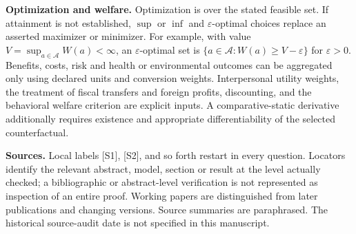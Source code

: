 \documentclass[11pt,a4paper]{article}
\begin{document}
\textbf{Optimization and welfare.} Optimization is over the stated feasible set. If attainment is not established, $\sup$ or $\inf$ and $\varepsilon$-optimal choices replace an asserted maximizer or minimizer. For example, with value $V=\sup_{a\in\mathcal A}W(a)<\infty$, an $\varepsilon$-optimal set is $\{a\in\mathcal A:W(a)\geq V-\varepsilon\}$ for $\varepsilon>0$. Benefits, costs, risk and health or environmental outcomes can be aggregated only using declared units and conversion weights. Interpersonal utility weights, the treatment of fiscal transfers and foreign profits, discounting, and the behavioral welfare criterion are explicit inputs. A comparative-static derivative additionally requires existence and appropriate differentiability of the selected counterfactual.

\textbf{Sources.} Local labels [S1], [S2], and so forth restart in every question. Locators identify the relevant abstract, model, section or result at the level actually checked; a bibliographic or abstract-level verification is not represented as inspection of an entire proof. Working papers are distinguished from later publications and changing versions. Source summaries are paraphrased. The historical source-audit date is not specified in this manuscript.
\end{document}

